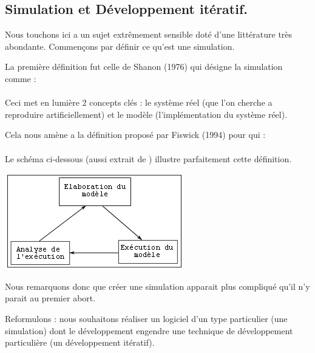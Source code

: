 \documentclass[a4paper,11pt]{article}
\begin{document}
\subsection{Simulation et Développement itératif.}

Nous touchons ici a un sujet extrêmement sensible doté d'une littérature très abondante. Commençons par définir ce qu'est une simulation.

La première définition fut celle de Shanon (1976) \cite{Shannon:1977:SMM:1102766.1102770} qui désigne la simulation comme : \\

\\ 

Ceci met en lumière 2 concepts clés : le système réel (que l'on cherche a reproduire artificiellement) et le modèle (l'implémentation du système réel). 

Cela nous amène a la définition proposé par Fiswick (1994) \cite{Fishwick94computersimulation:} pour qui : \\

\\

Le schéma ci-dessous (aussi extrait de \cite{Fishwick94computersimulation:} ) illustre parfaitement cette définition. 

\begin{center} \includegraphics[scale=0.7]{SimConception.PNG} \end{center}

Nous remarquons donc que créer une simulation apparait plus compliqué qu'il n'y parait au premier abort. 

Reformulons : nous souhaitons réaliser un logiciel d'un type particulier (une simulation) dont le développement engendre une technique de développement particulière (un développement itératif). 
\end{document}

